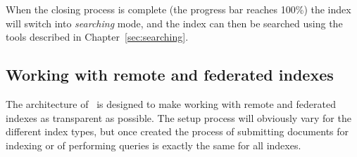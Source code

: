 When the closing process is complete (the progress bar reaches 100\%) the index
will switch into {\em searching} mode, and the index can then be searched using
the tools described in Chapter~\ref{sec:searching}.

\subsection{Working with remote and federated indexes}

The architecture of \Mimir\ is designed to make working with remote and
federated indexes as transparent as possible.  The setup process will obviously
vary for the different index types, but once created the process of submitting
documents for indexing or of performing queries is exactly the same for all
indexes.

